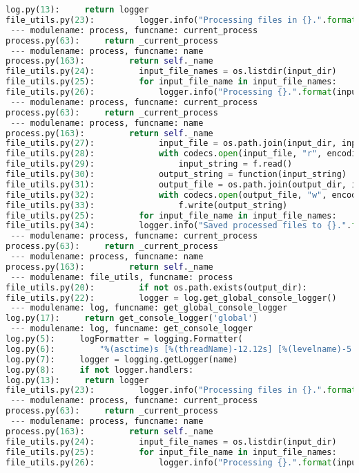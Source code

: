 \documentclass[11pt]{article}
\begin{document}
\begin{lstlisting}[language=Python]
log.py(13):     return logger
file_utils.py(23):         logger.info("Processing files in {}.".format(input_dir))
 --- modulename: process, funcname: current_process
process.py(63):     return _current_process
 --- modulename: process, funcname: name
process.py(163):         return self._name
file_utils.py(24):         input_file_names = os.listdir(input_dir)
file_utils.py(25):         for input_file_name in input_file_names:
file_utils.py(26):             logger.info("Processing {}.".format(input_file_name))
 --- modulename: process, funcname: current_process
process.py(63):     return _current_process
 --- modulename: process, funcname: name
process.py(163):         return self._name
file_utils.py(27):             input_file = os.path.join(input_dir, input_file_name)
file_utils.py(28):             with codecs.open(input_file, "r", encoding="UTF-8") as f:
file_utils.py(29):                 input_string = f.read()
file_utils.py(30):             output_string = function(input_string)
file_utils.py(31):             output_file = os.path.join(output_dir, input_file_name)
file_utils.py(32):             with codecs.open(output_file, "w", encoding="UTF-8") as f:
file_utils.py(33):                 f.write(output_string)
file_utils.py(25):         for input_file_name in input_file_names:
file_utils.py(34):         logger.info("Saved processed files to {}.".format(output_dir))
 --- modulename: process, funcname: current_process
process.py(63):     return _current_process
 --- modulename: process, funcname: name
process.py(163):         return self._name
 --- modulename: file_utils, funcname: process
file_utils.py(20):         if not os.path.exists(output_dir):
file_utils.py(22):         logger = log.get_global_console_logger()
 --- modulename: log, funcname: get_global_console_logger
log.py(17):     return get_console_logger('global')
 --- modulename: log, funcname: get_console_logger
log.py(5):     logFormatter = logging.Formatter(
log.py(6):         "%(asctime)s [%(threadName)-12.12s] [%(levelname)-5.5s]  %(message)s")
log.py(7):     logger = logging.getLogger(name)
log.py(8):     if not logger.handlers:
log.py(13):     return logger
file_utils.py(23):         logger.info("Processing files in {}.".format(input_dir))
 --- modulename: process, funcname: current_process
process.py(63):     return _current_process
 --- modulename: process, funcname: name
process.py(163):         return self._name
file_utils.py(24):         input_file_names = os.listdir(input_dir)
file_utils.py(25):         for input_file_name in input_file_names:
file_utils.py(26):             logger.info("Processing {}.".format(input_file_name))

\end{lstlisting}
\end{document}
